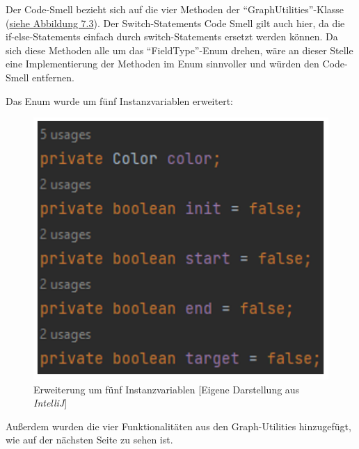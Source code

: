 \noindent Der Code-Smell bezieht sich auf die vier Methoden der \enquote{GraphUtilities}-Klasse (\hyperref[fig:graphutilities]{siehe Abbildung 7.3}). Der Switch-Statements Code Smell gilt auch hier, da die if-else-Statements einfach durch switch-Statements ersetzt werden können. Da sich diese Methoden alle um das \enquote{FieldType}-Enum drehen, wäre an dieser Stelle eine Implementierung der Methoden im Enum sinnvoller und würden den Code-Smell entfernen. 

\newpage
\noindent Das Enum wurde um fünf Instanzvariablen erweitert:

\begin{figure}[htbp]
\centering
\centerline{\includegraphics[scale=.55]{instanzvariablen}}
\caption{Erweiterung um fünf Instanzvariablen [Eigene Darstellung aus \emph{IntelliJ}]}
\label{fig:instanzvariablen}
\end{figure}

\noindent Außerdem wurden die vier Funktionalitäten aus den Graph-Utilities hinzugefügt, wie auf der nächsten Seite zu sehen ist.

